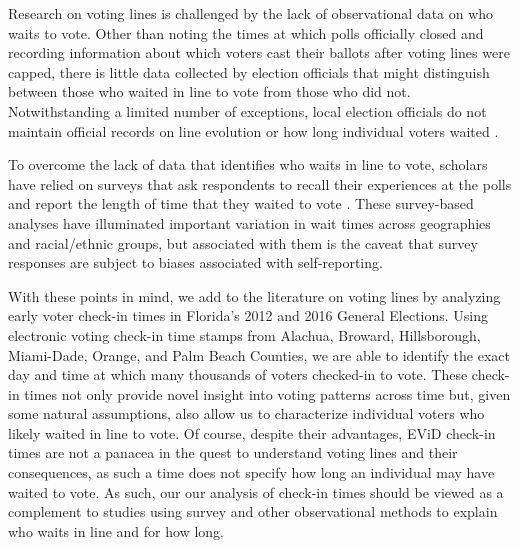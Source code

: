 \documentclass[12pt,titlepage]{article}
\begin{document}
Research on voting lines is challenged by the lack of observational
data on who waits to vote.  Other than noting the times at which polls
officially closed and recording information about which voters cast
their ballots after voting lines were capped, there is little data
collected by election officials that might distinguish between those
who waited in line to vote from those who did not.  Notwithstanding a
limited number of exceptions, local election officials do not maintain
official records on line evolution or how long individual voters
waited \citep{herron:confidence}.


To overcome the lack of data that identifies who waits in line to
vote, scholars have relied on surveys that ask respondents to recall
their experiences at the polls and report the length of time that they
waited to vote \citep{stewart:waitingtovote2012,
  pettigrew:racegapwaittimes}.  These survey-based analyses have
illuminated important variation in wait times across geographies and
racial/ethnic groups, but associated with them is the caveat that
survey responses are subject to biases associated with self-reporting.

With these points in mind, we add to the literature on voting lines by
analyzing early voter check-in times in Florida's 2012 and 2016
General Elections. Using electronic voting check-in time stamps from
Alachua, Broward, Hillsborough, Miami-Dade, Orange, and Palm Beach
Counties, we are able to identify the exact day and time at which many
thousands of voters checked-in to vote.  These check-in times not only
provide novel insight into voting patterns across time but, given some
natural assumptions, also allow us to characterize individual voters
who likely waited in line to vote. Of course, despite their advantages, 
EViD check-in times are not a panacea in the quest to understand voting 
lines and their consequences, as such a time does not specify how long 
an individual may have waited to vote.  As such, our our analysis of 
check-in times should be viewed as a complement to studies using 
survey and other observational methods to explain who waits in line 
and for how long.
\end{document}
